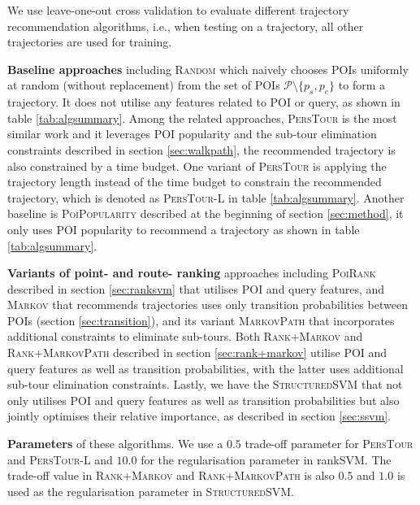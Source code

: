 We use leave-one-out cross validation to evaluate different trajectory recommendation algorithms,
i.e., when testing on a trajectory, all other trajectories are used for training.

{\bf Baseline approaches} including \textsc{Random} which naively chooses POIs uniformly at random
(without replacement) from the set of POIs $\mathcal{P} \setminus \{p_s, p_e \}$ to form a trajectory.
It does not utilise any features related to POI or query, as shown in  table \ref{tab:algsummary}.
Among the related approaches, \textsc{PersTour}\cite{ijcai15} is the most similar work and it
leverages POI popularity and the sub-tour elimination constraints described in section \ref{sec:walkpath},
the recommended trajectory is also constrained by a time budget.
One variant of \textsc{PersTour} is applying the trajectory length instead of the time budget to constrain
the recommended trajectory, which is denoted as \textsc{PersTour-L} in table \ref{tab:algsummary}.
Another baseline is \textsc{PoiPopularity} described at the beginning of section \ref{sec:method},
it only uses POI popularity to recommend a trajectory as shown in table \ref{tab:algsummary}.

{\bf Variants of point- and route- ranking} approaches including \textsc{PoiRank} 
described in section \ref{sec:ranksvm} that utilises POI and query features, 
and \textsc{Markov} that recommends trajectories uses only transition
probabilities between POIs (section \ref{sec:transition}), 
and its variant \textsc{MarkovPath} that incorporates additional constraints to eliminate sub-tours.
Both \textsc{Rank+Markov} and \textsc{Rank+MarkovPath} described in section \ref{sec:rank+markov}
utilise POI and query features as well as transition probabilities, with the latter uses
additional sub-tour elimination constraints.
Lastly, we have the \textsc{StructuredSVM} that not only utilises POI and query features as well as
transition probabilities but also jointly optimises their relative importance, as described in section \ref{sec:ssvm}.

{\bf Parameters} of these algorithms.
We use a $0.5$ trade-off parameter for \textsc{PersTour} and \textsc{PersTour-L}
and $10.0$ for the regularisation parameter in rankSVM.
The trade-off value in \textsc{Rank+Markov} and \textsc{Rank+MarkovPath} is also $0.5$
and $1.0$ is used as the regularisation parameter in \textsc{StructuredSVM}.


